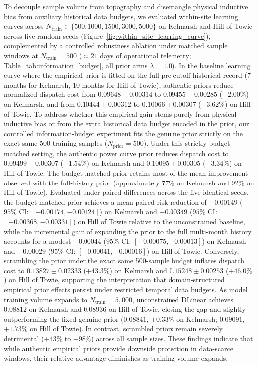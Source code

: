 To decouple sample volume from topography and disentangle physical inductive bias from auxiliary historical data budgets, we evaluated within-site learning curves across $N_{\text{train}} \in \{500, 1000, 1500, 3000, 5000\}$ on Kelmarsh and Hill of Towie across five random seeds (Figure~\ref{fig:within_site_learning_curve}), complemented by a controlled robustness ablation under matched sample windows at $N_{\text{train}}=500$ ($\approx 21$ days of operational telemetry; Table~\ref{tab:information_budget}, all prior arms $\lambda=1.0$). In the baseline learning curve where the empirical prior is fitted on the full pre-cutoff historical record (7 months for Kelmarsh, 10 months for Hill of Towie), authentic priors reduce normalized dispatch cost from $0.09648 \pm 0.00314$ to $0.09455 \pm 0.00285$ ($-2.00\%$) on Kelmarsh, and from $0.10444 \pm 0.00312$ to $0.10066 \pm 0.00307$ ($-3.62\%$) on Hill of Towie. To address whether this empirical gain stems purely from physical inductive bias or from the extra historical data budget encoded in the prior, our controlled information-budget experiment fits the genuine prior strictly on the exact same 500 training samples ($N_{\text{prior}}=500$). Under this strictly budget-matched setting, the authentic power curve prior reduces dispatch cost to $0.09499 \pm 0.00307$ ($-1.54\%$) on Kelmarsh and $0.10095 \pm 0.00305$ ($-3.34\%$) on Hill of Towie. The budget-matched prior retains most of the mean improvement observed with the full-history prior (approximately $77\%$ on Kelmarsh and $92\%$ on Hill of Towie). Evaluated under paired differences across the five identical seeds, the budget-matched prior achieves a mean paired risk reduction of $-0.00149$ ($95\%$ CI: $[-0.00174, -0.00124]$) on Kelmarsh and $-0.00349$ ($95\%$ CI: $[-0.00368, -0.00331]$) on Hill of Towie relative to the unconstrained baseline, while the incremental gain of expanding the prior to the full multi-month history accounts for a modest $-0.00044$ ($95\%$ CI: $[-0.00075, -0.00013]$) on Kelmarsh and $-0.00029$ ($95\%$ CI: $[-0.00041, -0.00016]$) on Hill of Towie. Conversely, scrambling the prior under the exact same 500-sample budget inflates dispatch cost to $0.13827 \pm 0.02333$ ($+43.3\%$) on Kelmarsh and $0.15248 \pm 0.00253$ ($+46.0\%$) on Hill of Towie, supporting the interpretation that domain-structured empirical prior effects persist under restricted temporal data budgets. As model training volume expands to $N_{\text{train}} = 5{,}000$, unconstrained DLinear achieves $0.08812$ on Kelmarsh and $0.08936$ on Hill of Towie, closing the gap and slightly outperforming the fixed genuine prior ($0.08841$, $+0.33\%$ on Kelmarsh; $0.09091$, $+1.73\%$ on Hill of Towie). In contrast, scrambled priors remain severely detrimental ($+43\%$ to $+98\%$) across all sample sizes. These findings indicate that while authentic empirical priors provide downside protection in data-scarce windows, their relative advantage diminishes as training volume expands.

